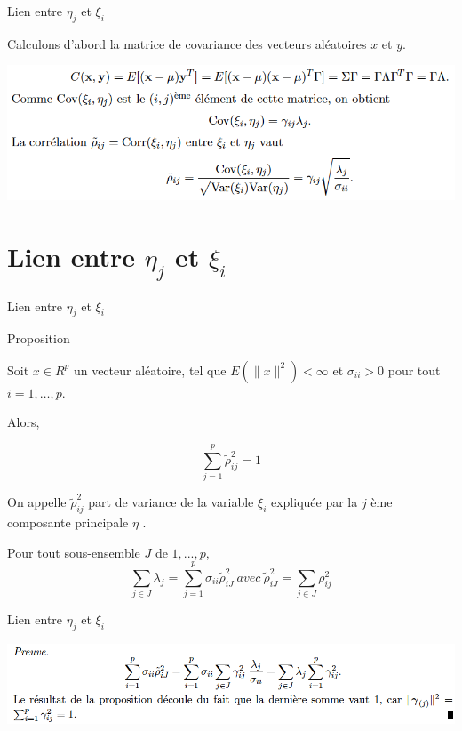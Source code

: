 \documentclass[12pt]{beamer}
\begin{document}

\begin{frame}{Lien entre $\eta_j$ et $\xi_i$}

  
  Calculons d’abord la matrice de covariance des vecteurs aléatoires $x$ et $y$.
  
  \includegraphics[scale=0.4]{EtaVar.png}
  
  
\end{frame}



\section{Lien entre $\eta_j$ et $\xi_i$}
\begin{frame}{Lien entre $\eta_j$ et $\xi_i$}

  \begin{block}{Proposition}
  
  Soit $x \in R^p$ un vecteur aléatoire, tel que $E(\parallel x \parallel^2) < \infty$ et $\sigma_{ii} > 0$ pour tout $i = 1, \ldots ,p$. 
 
  Alors, 
  
  $$\sum_{j=1}^p \tilde{\rho}^2_{ij} =1$$
  
  \end{block}
 
  On appelle $ \tilde{\rho}^2_{ij} $ part de variance de la variable $\xi_i$ expliquée par la $j$ ème composante principale $\eta$ .
  
  Pour tout sous-ensemble $J$ de $ {1, . . . ,p}$,
  $$\sum_{j \in J} \lambda_j=\sum_{j=1}^p \sigma_{ii}\tilde{\rho}^2_{iJ} \ avec \  \tilde{\rho}^2_{iJ} = \sum_{j \in J}{\rho}^2_{ij} $$
\end{frame}


\begin{frame}{Lien entre $\eta_j$ et $\xi_i$}


 \includegraphics[scale=0.37]{Rho_ij.png}


\end{frame}
\end{document}

